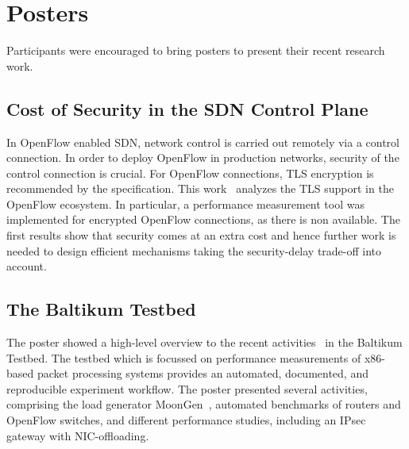 \section{Posters}\label{sec:posters}

Participants were encouraged to bring posters to present
their recent research work.

\subsection{Cost of Security in the SDN Control Plane}

In OpenFlow enabled \ac{SDN}, network control is carried out remotely via a
control connection. In order to deploy OpenFlow in production networks,
security of the control connection is crucial. For OpenFlow connections, TLS
encryption is recommended by the specification. This work~\cite{wkellerer:conext:2015} analyzes the TLS support in the OpenFlow
ecosystem. In particular, a performance measurement tool was implemented for
encrypted OpenFlow connections, as there is non available. The first results
show that security comes at an extra cost and hence further work is needed to
design efficient mechanisms taking the security-delay trade-off into account.


\subsection{The Baltikum Testbed}

The poster showed a high-level overview to the recent activities~\cite{pemmerich:imc:2015, sgallenmuller:ancs:2015, draumer:cloudnet:2016,
draumer:anrw:2016} in the Baltikum Testbed. The testbed which is focussed on
performance measurements of x86-based packet processing systems provides an
automated, documented, and reproducible experiment workflow. The poster
presented several activities, comprising the load generator MoonGen~\cite{pemmerich:imc:2015}, automated benchmarks of routers and OpenFlow
switches, and different performance studies, including an IPsec gateway with
NIC-offloading.

